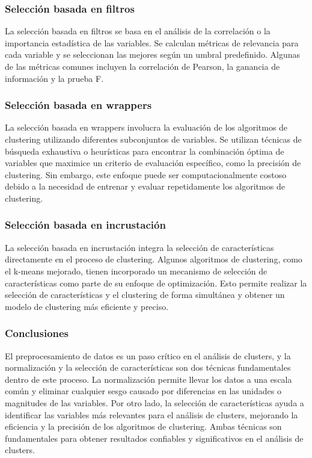 \documentclass{article}
\begin{document}
\subsubsection{Selección basada en filtros}
La selección basada en filtros se basa en el análisis de la correlación o la importancia estadística de las variables. Se calculan métricas de relevancia para cada variable y se seleccionan las mejores según un umbral predefinido. Algunas de las métricas comunes incluyen la correlación de Pearson, la ganancia de información y la prueba F.

\subsubsection{Selección basada en wrappers}
La selección basada en wrappers involucra la evaluación de los algoritmos de clustering utilizando diferentes subconjuntos de variables. Se utilizan técnicas de búsqueda exhaustiva o heurísticas para encontrar la combinación óptima de variables que maximice un criterio de evaluación específico, como la precisión de clustering. Sin embargo, este enfoque puede ser computacionalmente costoso debido a la necesidad de entrenar y evaluar repetidamente los algoritmos de clustering.

\subsubsection{Selección basada en incrustación}
La selección basada en incrustación integra la selección de características directamente en el proceso de clustering. Algunos algoritmos de clustering, como el k-means mejorado, tienen incorporado un mecanismo de selección de características como parte de su enfoque de optimización. Esto permite realizar la selección de características y el clustering de forma simultánea y obtener un modelo de clustering más eficiente y preciso.

\subsubsection*{Conclusiones}
El preprocesamiento de datos es un paso crítico en el análisis de clusters, y la normalización y la selección de características son dos técnicas fundamentales dentro de este proceso. La normalización permite llevar los datos a una escala común y eliminar cualquier sesgo causado por diferencias en las unidades o magnitudes de las variables. Por otro lado, la selección de características ayuda a identificar las variables más relevantes para el análisis de clusters, mejorando la eficiencia y la precisión de los algoritmos de clustering. Ambas técnicas son fundamentales para obtener resultados confiables y significativos en el análisis de clusters.
\end{document}
